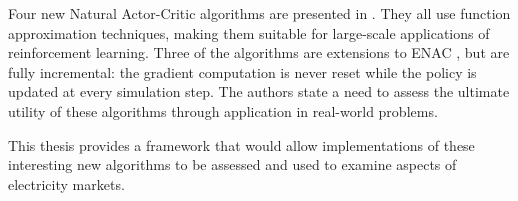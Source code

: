 Four new Natural Actor-Critic algorithms are presented in .
They all use function approximation techniques, making them suitable for
large-scale applications of reinforcement learning.  Three of the algorithms
are extensions to ENAC \cite{peters:enac}, but are fully incremental: the
gradient computation is never reset while the policy is updated at every
simulation step.  The authors state a need to assess the ultimate utility of
these algorithms through application in real-world problems.

This thesis provides a framework that would allow implementations of these
interesting new algorithms to be assessed and used to examine aspects of
electricity markets.

%
%
%
